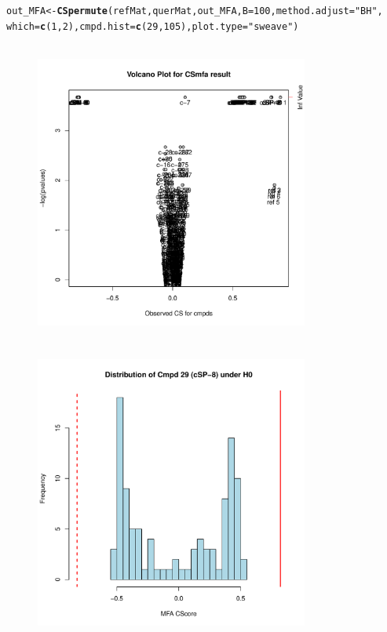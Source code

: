 \documentclass[a4paper]{article}\usepackage[]{graphicx}\usepackage[]{color}
\makeatletter
\newcommand{\hlnum}[1]{\textcolor[rgb]{0.686,0.059,0.569}{#1}}%
\newcommand{\hlstr}[1]{\textcolor[rgb]{0.192,0.494,0.8}{#1}}%
\newcommand{\hlstd}[1]{\textcolor[rgb]{0.345,0.345,0.345}{#1}}%
\newcommand{\hlkwb}[1]{\textcolor[rgb]{0.69,0.353,0.396}{#1}}%
\newcommand{\hlkwc}[1]{\textcolor[rgb]{0.333,0.667,0.333}{#1}}%
\newcommand{\hlkwd}[1]{\textcolor[rgb]{0.737,0.353,0.396}{\textbf{#1}}}%
\newenvironment{kframe}{%
 \def\at@end@of@kframe{}%
 \ifinner\ifhmode%
  \def\at@end@of@kframe{\end{minipage}}%
  \begin{minipage}{\columnwidth}%
 \fi\fi%
 \def\FrameCommand##1{\hskip\@totalleftmargin \hskip-\fboxsep
 \colorbox{shadecolor}{##1}\hskip-\fboxsep
     \hskip-\linewidth \hskip-\@totalleftmargin \hskip\columnwidth}%
 \MakeFramed {\advance\hsize-\width
   \@totalleftmargin\z@ \linewidth\hsize
   \@setminipage}}%
 {\par\unskip\endMakeFramed%
 \at@end@of@kframe}
\newenvironment{knitrout}{}{} %
\makeatother
\begin{document}
\begin{knitrout}
\color{fgcolor}\begin{kframe}
\begin{alltt}
\hlstd{out_MFA} \hlkwb{<-} \hlkwd{CSpermute}\hlstd{(refMat,querMat,out_MFA,}\hlkwc{B}\hlstd{=}\hlnum{100}\hlstd{,}\hlkwc{method.adjust}\hlstd{=}\hlstr{"BH"}\hlstd{,}
                \hlkwc{which}\hlstd{=}\hlkwd{c}\hlstd{(}\hlnum{1}\hlstd{,}\hlnum{2}\hlstd{),}\hlkwc{cmpd.hist}\hlstd{=}\hlkwd{c}\hlstd{(}\hlnum{29}\hlstd{,}\hlnum{105}\hlstd{),}\hlkwc{plot.type}\hlstd{=}\hlstr{"sweave"}\hlstd{)}
\end{alltt}
\end{kframe}\begin{figure}[H]


\includegraphics[width=9cm,height=10cm]{figure/CSpermuteplots-1} 
\includegraphics[width=9cm,height=10cm]{figure/CSpermuteplots-2} 

\end{figure}
\end{knitrout}
\end{document}
